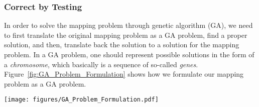 \subsubsection{Correct by Testing}

In order to solve the mapping problem through genetic algorithm (GA), we need to first translate the original mapping problem as a GA problem, find a proper solution, and then, translate back the solution to a solution for the mapping problem. In a GA problem, one should represent possible solutions in the form of a \textit{chromosome}, which basically is a sequence of so-called \textit{genes}. Figure~\ref{fig:GA_Problem_Formulation} shows how we formulate our mapping problem as a GA problem.   

\begin{figure*}[h]
  \centering
  \texttt{[image: figures/GA\_Problem\_Formulation.pdf]}
  \caption{The genetic algorithm problem formulation. }
  \label{fig:GA_Problem_Formulation}
\end{figure*}

